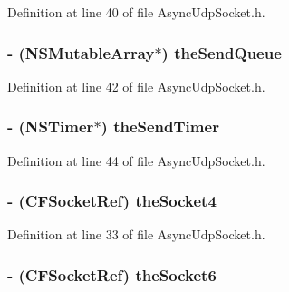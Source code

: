 Definition at line 40 of file AsyncUdpSocket.h.

\hypertarget{interface_async_udp_socket_a53f90f3fa05fcc0775b3b941799c0d63}{
\subsubsection[{theSendQueue}]{\setlength{\rightskip}{0pt plus 5cm}-\/ (NSMutableArray$\ast$) {\bf theSendQueue}}}
\label{interface_async_udp_socket_a53f90f3fa05fcc0775b3b941799c0d63}


Definition at line 42 of file AsyncUdpSocket.h.

\hypertarget{interface_async_udp_socket_a250938cf3ea1f75b3677393e6cb464dc}{
\subsubsection[{theSendTimer}]{\setlength{\rightskip}{0pt plus 5cm}-\/ (NSTimer$\ast$) {\bf theSendTimer}}}
\label{interface_async_udp_socket_a250938cf3ea1f75b3677393e6cb464dc}


Definition at line 44 of file AsyncUdpSocket.h.

\hypertarget{interface_async_udp_socket_a20f3d1f4bf10b95ab5e0c5b3265c5bee}{
\subsubsection[{theSocket4}]{\setlength{\rightskip}{0pt plus 5cm}-\/ (CFSocketRef) {\bf theSocket4}}}
\label{interface_async_udp_socket_a20f3d1f4bf10b95ab5e0c5b3265c5bee}


Definition at line 33 of file AsyncUdpSocket.h.

\hypertarget{interface_async_udp_socket_a94c7d0086b3d4a9495e0ef87bca42a22}{
\subsubsection[{theSocket6}]{\setlength{\rightskip}{0pt plus 5cm}-\/ (CFSocketRef) {\bf theSocket6}}}
\label{interface_async_udp_socket_a94c7d0086b3d4a9495e0ef87bca42a22}


